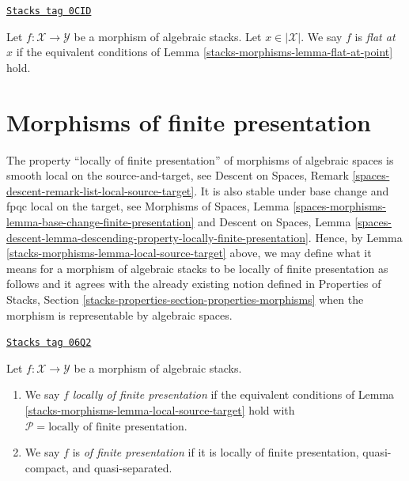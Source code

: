 \begin{definition}
\label{stacks-morphisms-definition-flat-at-point}
\href{https://stacks.math.columbia.edu/tag/0CID}{\texttt{Stacks tag 0CID}}

Let $f : \mathcal{X} \to \mathcal{Y}$ be a morphism of algebraic stacks.
Let $x \in |\mathcal{X}|$. We say $f$ is {\it flat at $x$} if the
equivalent conditions of Lemma \ref{stacks-morphisms-lemma-flat-at-point} hold.
\end{definition}

\section{Morphisms of finite presentation}
\label{stacks-morphisms-section-finite-presentation}
The property ``locally of finite presentation'' of morphisms of algebraic
spaces is smooth local on the source-and-target, see
Descent on Spaces, Remark \ref{spaces-descent-remark-list-local-source-target}.
It is also stable under base change and fpqc local on the target, see
Morphisms of Spaces,
Lemma \ref{spaces-morphisms-lemma-base-change-finite-presentation}
and
Descent on Spaces, Lemma
\ref{spaces-descent-lemma-descending-property-locally-finite-presentation}.
Hence, by
Lemma \ref{stacks-morphisms-lemma-local-source-target}
above, we may define what it means for a morphism of algebraic stacks
to be locally of finite presentation as follows and it agrees with the already
existing notion defined in
Properties of Stacks,
Section \ref{stacks-properties-section-properties-morphisms}
when the morphism is representable by algebraic spaces.

\begin{definition}
\label{stacks-morphisms-definition-locally-finite-presentation}
\href{https://stacks.math.columbia.edu/tag/06Q2}{\texttt{Stacks tag 06Q2}}

Let $f : \mathcal{X} \to \mathcal{Y}$ be a morphism of algebraic stacks.
\begin{enumerate}
\item We say $f$
{\it locally of finite presentation} if the equivalent conditions of
Lemma \ref{stacks-morphisms-lemma-local-source-target}
hold with
$\mathcal{P} = \text{locally of finite presentation}$.
\item We say $f$ is
{\it of finite presentation} if it is locally of finite presentation,
quasi-compact, and quasi-separated.
\end{enumerate}
\end{definition}

